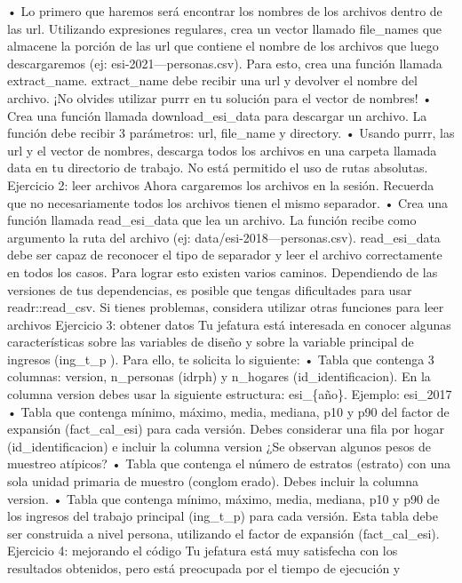 \documentclass[
]{article}
\begin{document}
• Lo primero que haremos será encontrar los nombres de los archivos
dentro de las url. Utilizando expresiones regulares, crea un vector
llamado file\_names que almacene la porción de las url que contiene el
nombre de los archivos que luego descargaremos (ej:
esi-2021---personas.csv). Para esto, crea una función llamada
extract\_name. extract\_name debe recibir una url y devolver el nombre
del archivo. ¡No olvides utilizar purrr en tu solución para el vector de
nombres! • Crea una función llamada download\_esi\_data para descargar
un archivo. La función debe recibir 3 parámetros: url, file\_name y
directory. • Usando purrr, las url y el vector de nombres, descarga
todos los archivos en una carpeta llamada data en tu directorio de
trabajo. No está permitido el uso de rutas absolutas. Ejercicio 2: leer
archivos Ahora cargaremos los archivos en la sesión. Recuerda que no
necesariamente todos los archivos tienen el mismo separador. • Crea una
función llamada read\_esi\_data que lea un archivo. La función recibe
como argumento la ruta del archivo (ej: data/esi-2018---personas.csv).
read\_esi\_data debe ser capaz de reconocer el tipo de separador y leer
el archivo correctamente en todos los casos. Para lograr esto existen
varios caminos. Dependiendo de las versiones de tus dependencias, es
posible que tengas dificultades para usar readr::read\_csv. Si tienes
problemas, considera utilizar otras funciones para leer archivos
Ejercicio 3: obtener datos Tu jefatura está interesada en conocer
algunas características sobre las variables de diseño y sobre la
variable principal de ingresos (ing\_t\_p ). Para ello, te solicita lo
siguiente: • Tabla que contenga 3 columnas: version, n\_personas (idrph)
y n\_hogares (id\_identificacion). En la columna version debes usar la
siguiente estructura: esi\_\{año\}. Ejemplo: esi\_2017 • Tabla que
contenga mínimo, máximo, media, mediana, p10 y p90 del factor de
expansión (fact\_cal\_esi) para cada versión. Debes considerar una fila
por hogar (id\_identificacion) e incluir la columna version ¿Se observan
algunos pesos de muestreo atípicos? • Tabla que contenga el número de
estratos (estrato) con una sola unidad primaria de muestro
(conglomerado). Debes incluir la columna version. • Tabla que contenga
mínimo, máximo, media, mediana, p10 y p90 de los ingresos del trabajo
principal (ing\_t\_p) para cada versión. Esta tabla debe ser construida
a nivel persona, utilizando el factor de expansión (fact\_cal\_esi).
Ejercicio 4: mejorando el código Tu jefatura está muy satisfecha con los
resultados obtenidos, pero está preocupada por el tiempo de ejecución y
\end{document}
